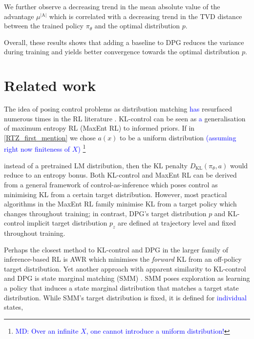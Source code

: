We further observe a decreasing trend in the mean absolute value of the advantage $\mu^{|\mathrm{A}|}$ which is correlated with a decreasing trend in the TVD distance between the trained policy ${\pi_\theta}$ and the optimal distribution $p$.

Overall, these results shows that adding a baseline to DPG reduces the variance during training and yields better convergence towards the optimal distribution $p$.  

\section{Related work}

The idea of posing control problems as distribution matching \textcolor{blue}{has} resurfaced numerous times in the RL literature \citep{kappen2012optimal,friston2010action,levine2018reinforcement,hafner2020action,BUCKLEY201755}. KL-control can be seen as \textcolor{blue}{a} generalisation of maximum entropy RL (MaxEnt RL) \citep{pmlr-v70-haarnoja17a,sac} to informed priors. If in \eqref{RTZ_first_mention} we chose $a(x)$ to be a uniform distribution \textcolor{blue}{(assuming right now finiteness of $X$)}
{\color{blue}\footnote{\textcolor{blue}{MD: Over an infinite $X$, one cannot introduce a uniform distribution!}}} 

instead of a pretrained LM distribution, then the KL penalty $D_{\mathrm{KL}}({\pi_\theta}, a)$ would reduce to an entropy bonus. Both KL-control and MaxEnt RL can be derived from a general framework of control-as-inference \citep{levine2018reinforcement} which poses control as minimising KL from a certain target distribution. However, most practical algorithms in the MaxEnt RL family minimise KL from a target policy which changes throughout training; in contrast, DPG’s target distribution $p$ and KL-control implicit target distribution $p_z$ are defined at trajectory level and fixed throughout training. 

Perhaps the closest method to KL-control and DPG in the larger family of inference-based RL \citep{coadaptation} is AWR \citep{awr} which minimises the \emph{forward} KL from an off-policy target distribution. Yet another approach with apparent similarity to KL-control and DPG is state marginal matching (SMM) \citep{maxentexplor,smm2019}. SMM poses exploration as learning a policy that induces a state marginal distribution that matches a target state distribution. While SMM's target distribution is fixed, it is defined for \textcolor{blue}{individual} states,

